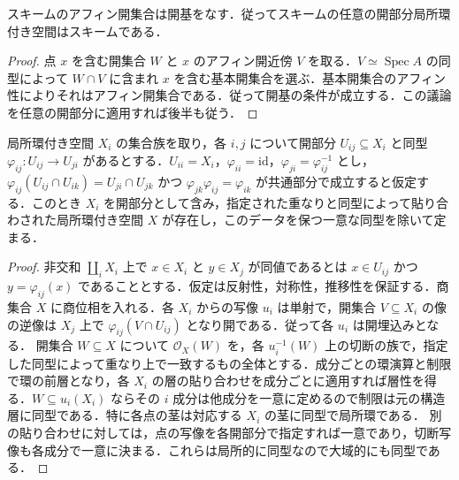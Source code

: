 \begin{prop}[アフィン開集合による開基]
スキームのアフィン開集合は開基をなす．従ってスキームの任意の開部分局所環付き空間はスキームである．
\end{prop}
\begin{proof}
点 $x$ を含む開集合 $W$ と $x$ のアフィン開近傍 $V$ を取る．$V\simeq\operatorname{Spec}A$ の同型によって $W\cap V$ に含まれ $x$ を含む基本開集合を選ぶ．基本開集合のアフィン性によりそれはアフィン開集合である．従って開基の条件が成立する．この議論を任意の開部分に適用すれば後半も従う．
\end{proof}
\begin{prop}[局所環付き空間の貼り合わせ]
局所環付き空間 $X_i$ の集合族を取り，各 $i,j$ について開部分 $U_{ij}\subseteq X_i$ と同型 $\varphi_{ij}:U_{ij}\to U_{ji}$ があるとする．$U_{ii}=X_i$，$\varphi_{ii}=\mathrm{id}$，$\varphi_{ji}=\varphi_{ij}^{-1}$ とし，$\varphi_{ij}(U_{ij}\cap U_{ik})=U_{ji}\cap U_{jk}$ かつ $\varphi_{jk}\varphi_{ij}=\varphi_{ik}$ が共通部分で成立すると仮定する．このとき $X_i$ を開部分として含み，指定された重なりと同型によって貼り合わされた局所環付き空間 $X$ が存在し，このデータを保つ一意な同型を除いて定まる．
\end{prop}
\begin{proof}
非交和 $\coprod_i X_i$ 上で $x\in X_i$ と $y\in X_j$ が同値であるとは $x\in U_{ij}$ かつ $y=\varphi_{ij}(x)$ であることとする．仮定は反射性，対称性，推移性を保証する．商集合 $X$ に商位相を入れる．各 $X_i$ からの写像 $u_i$ は単射で，開集合 $V\subseteq X_i$ の像の逆像は $X_j$ 上で $\varphi_{ij}(V\cap U_{ij})$ となり開である．従って各 $u_i$ は開埋込みとなる．
開集合 $W\subseteq X$ について $\mathcal O_X(W)$ を，各 $u_i^{-1}(W)$ 上の切断の族で，指定した同型によって重なり上で一致するもの全体とする．成分ごとの環演算と制限で環の前層となり，各 $X_i$ の層の貼り合わせを成分ごとに適用すれば層性を得る．$W\subseteq u_i(X_i)$ ならその $i$ 成分は他成分を一意に定めるので制限は元の構造層に同型である．特に各点の茎は対応する $X_i$ の茎に同型で局所環である．
別の貼り合わせに対しては，点の写像を各開部分で指定すれば一意であり，切断写像も各成分で一意に決まる．これらは局所的に同型なので大域的にも同型である．
\end{proof}
